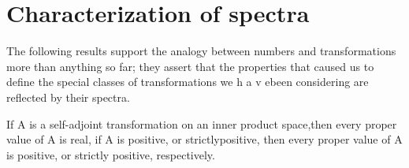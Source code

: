 \section{Characterization of spectra}

The following results support the analogy between numbers and transformations
more than anything so far; they assert that the properties that caused us to
define the special classes of transformations we h a v ebeen considering are
reflected by their spectra.

\begin{theorem}
    If A is a self-adjoint transformation on an inner product space,then every proper value of A is real, if A is positive, or strictlypositive, then every proper value of A is positive, or strictly positive, respectively.
\end{theorem}